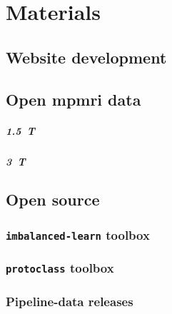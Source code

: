 \chapter{Materials}\label{chap:4}

\section{Website development}

\section{Open \acs*{mpmri} data}

\paragraph{\SI{1.5}{\tesla}}

\paragraph{\SI{3}{\tesla}}

\section{Open source}

\subsection{\texttt{imbalanced-learn} toolbox}

\subsection{\texttt{protoclass} toolbox}

\subsection{Pipeline-data releases}